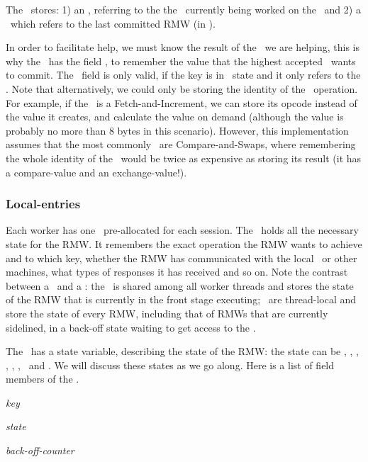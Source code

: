 \custvspace
{}
The \kv~stores: 1) an \rmw, referring to the the \RMW\ currently being worked on the \logno\ and 2) a \comrmw~which refers to the last committed RMW  (in \comlogno).


\custvspace
{}
In order to facilitate help, we must know the result of the \RMW\ we are helping, this is why the \kv\ has the field \accval, to remember the value that the highest accepted \RMW\ wants to commit.
The \accval\ field is only valid, if the key is in \acced\ state and it only refers to the \logno. Note that alternatively, we could only be storing the identity of the \RMW\ operation. For example, if the \RMW\ is a Fetch-and-Increment, we can store its opcode instead of the value it creates, and calculate the value on demand (although the value is probably no more than 8 bytes in this scenario). 
However, this implementation assumes that the most commonly \RMWs\ are Compare-and-Swaps, where remembering the whole identity of the \RMW\ would be twice as expensive as storing its result (it has a compare-value and an exchange-value!).

\subsubsection{Local-entries} \label{sec:base:loc}
\custvspace
{} Each worker has one \locentry\ pre-allocated for each session.
The \locentry\ holds all the necessary state for the RMW. It remembers the exact operation the RMW wants to achieve and to which key, whether the RMW has communicated with the local \kv\ or other machines, what types of responses it has received and so on. Note the contrast between a \kv\ and a \locentry: the \kv\ is shared among all worker threads and stores the state of the RMW that is currently in the front stage executing; \locentries\ are thread-local and store the state of every RMW, including that of RMWs that are currently sidelined, in a back-off state waiting to get access to the \kv.

The \locentry\ has a state variable, describing the state of the RMW: the state can be \invalid, \proped, \acced, \need, \retry, \bcast, \bcasthelp\ and \committed. We will discuss these states as we go along. Here is a list of field members of the \locentry.
\squishenum
\item \emph{key}
\item \emph{state}
\item \accval
\item \acclogno
\item \rmw
\item \emph{back-off-counter}
\item \helpflag
\item \helploc
\squishenumend

